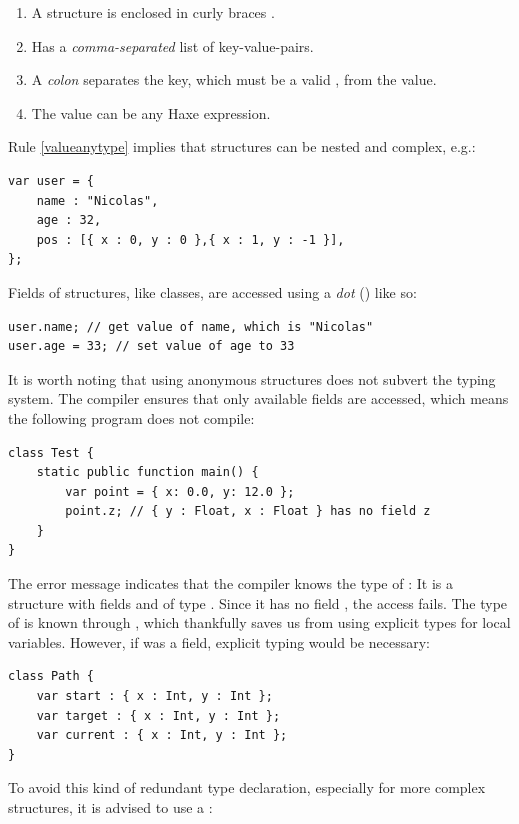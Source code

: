\documentclass{haxe}
\begin{document}
\begin{enumerate}
	\item A structure is enclosed in curly braces \expr{$\left\{\right\}$}. 
	\item Has a \emph{comma-separated} list of key-value-pairs.
	\item A \emph{colon} separates the key, which must be a valid , from the value.
	\item\label{valueanytype} The value can be any Haxe expression.
\end{enumerate}
Rule \ref{valueanytype} implies that structures can be nested and complex, e.g.:

\begin{lstlisting}
var user = {
    name : "Nicolas",
    age : 32,
    pos : [{ x : 0, y : 0 },{ x : 1, y : -1 }],
};
\end{lstlisting}
Fields of structures, like classes, are accessed using a \emph{dot} () like so:

\begin{lstlisting}
user.name; // get value of name, which is "Nicolas"
user.age = 33; // set value of age to 33
\end{lstlisting}
It is worth noting that using anonymous structures does not subvert the typing system. The compiler ensures that only available fields are accessed, which means the following program does not compile:

\begin{lstlisting}
class Test {
	static public function main() {
		var point = { x: 0.0, y: 12.0 };
		point.z; // { y : Float, x : Float } has no field z
	}
}
\end{lstlisting}
The error message indicates that the compiler knows the type of : It is a structure with fields  and  of type . Since it has no field , the access fails.
The type of  is known through , which thankfully saves us from using explicit types for local variables. However, if  was a field, explicit typing would be necessary:

\begin{lstlisting}
class Path {
    var start : { x : Int, y : Int };
    var target : { x : Int, y : Int };
    var current : { x : Int, y : Int };
}
\end{lstlisting}
To avoid this kind of redundant type declaration, especially for more complex structures, it is advised to use a :
\end{document}
